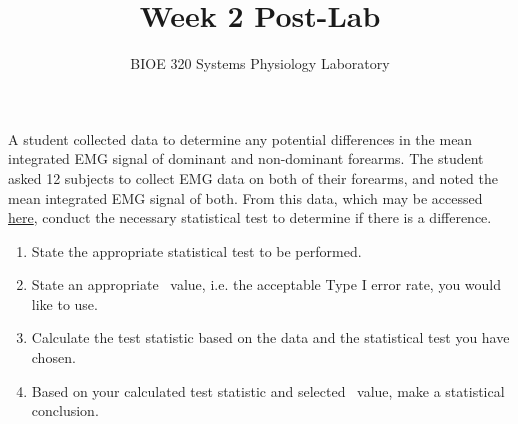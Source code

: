 \documentclass{article}
\title{Week 2 Post-Lab}
\author{BIOE 320 Systems Physiology Laboratory}
\date{}
\begin{document}
\maketitle
\large

A student collected data to determine any potential differences in the mean integrated EMG signal of dominant and non-dominant forearms. The student asked 12 subjects to collect EMG data on both of their forearms, and noted the mean integrated EMG signal of both. From this data, which may be accessed \href{https://jameslong12.github.io/BIOE320/Assignments.html}{here}, conduct the necessary statistical test to determine if there is a difference.

\begin{enumerate}
	\item State the appropriate statistical test to be performed.
	\item State an appropriate \textalpha\ value, i.e. the acceptable Type I error rate, you would like to use. 
	\item Calculate the test statistic based on the data and the statistical test you have chosen.
	\item Based on your calculated test statistic and selected \textalpha\ value, make a statistical conclusion.
\end{enumerate}
\end{document}
